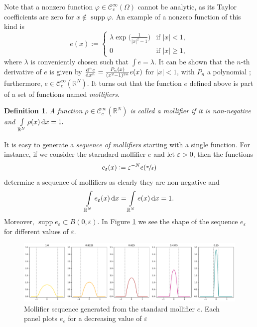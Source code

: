 \documentclass[a4paper,doc,11pt]{article}
\newtheorem{definition}[theorem]{Definition}
\newcommand{\R}{\mathbb{R}}
\newcommand{\CC}{\mathcal{C}}
\DeclareMathOperator{\supp}{supp}
\begin{document}
Note that a nonzero function \(\varphi \in \CC_c^\infty (\Omega)\) cannot be analytic, as its Taylor coefficients are zero for \( x \notin \supp \varphi\). An example of a nonzero function of this kind is 
\[
    e(x) := 
    \begin{cases}
        \lambda \exp \Big( \frac{1}{|x|^2-1} \Big) & \text{if } |x| < 1,
        \\
        0   & \text{if } |x| \geq 1,
    \end{cases}
\]
where \(\lambda\) is conveniently chosen such that \( \int e = \lambda \).
It can be shown that the \(n\)-th derivative of \(e\) is given by \( \od[n]{e}{x} = \frac{P_n(x)}{(x^2-1)^{2n}} e(x) \) for \( |x| < 1\), with \(P_n\) a polynomial \citep{Ball2019}; furthermore, \( e \in \CC_c^\infty (\R^N)\). 
It turns out that the function \(e\) defined above is part of a set of functions named \emph{mollifiers}. 

\begin{definition}
    A function \( \rho \in \CC_c^\infty(\R^N)\) is called a \emph{mollifier} if it is non-negative and 
    \(
        \int\limits_{\R^N} \rho(x) \dif x = 1.
    \)
\end{definition}

It is easy to generate a \emph{sequence of mollifiers} starting with a single function. For instance, if we consider the starndard mollifier \(e\) and let \(\varepsilon > 0\), then the functions
\[
    e_\varepsilon (x) := \varepsilon^{-N} e( \nicefrac x \varepsilon )
\]
determine a sequence of mollifiers as clearly they are non-negative and 
\[
    \int\limits_{\R^N} e_\varepsilon (x) \dif x = \int\limits_{\R^N} e(x) \dif x = 1.
\]
Moreover, \( \supp e_\varepsilon \subset B(0,\varepsilon) \). In Figure \ref{fig:1-Moll} we see the shape of the sequence \( e_\varepsilon\) for different values of \(\varepsilon\).
%

\begin{figure}
    \centering
    \includegraphics[width = \textwidth]{Fig-1_Moll.pdf}
    \caption{Mollifier sequence generated from the standard mollifier \(e\). Each panel plots \(e_\varepsilon\) for a decreasing value of \(\varepsilon\)}
    \label{fig:1-Moll}
\end{figure}
\end{document}
